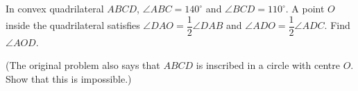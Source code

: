 In convex quadrilateral $ABCD$, $\angle ABC=140^\circ$ and $\angle BCD=110^\circ$. A point $O$ inside the quadrilateral satisfies $\angle DAO=\dfrac{1}{2}\angle DAB$ and $\angle ADO=\dfrac{1}{2}\angle ADC$. Find $\angle AOD$.

(The original problem also says that $ABCD$ is inscribed in a circle with centre $O$. Show that this is impossible.)
